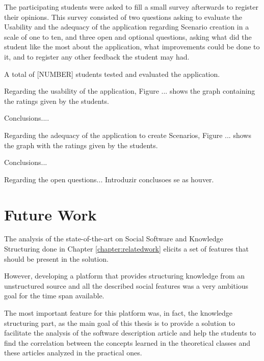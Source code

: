 \documentclass{llncs}
\begin{document}
The participating students were asked to fill a small survey afterwards to register their opinions.
This survey consisted of two questions asking to evaluate the Usability and the adequacy of the application regarding Scenario creation in a scale of one to ten, and three open and optional questions, asking what did the student like the most about the application, what improvements could be done to it, and to register any other feedback the student may had.

A total of [NUMBER] students tested and evaluated the application. 

Regarding the usability of the application, Figure ... shows the graph containing the ratings given by the students.

Conclusions....

Regarding the adequacy of the application to create Scenarios, Figure ... shows the graph with the ratings given by the students.

Conclusions...
\begin{figure}
\centering
{}
\end{figure}

Regarding the open questions... Introduzir conclusoes se as houver.
 

\section{Future Work}
\label{futureWork}

The analysis of the state-of-the-art on Social Software and Knowledge Structuring done in Chapter \ref{chapter:relatedwork} elicits a set of features that should be present in the solution.

However, developing a platform that provides structuring knowledge from an unstructured source and all the described social features was a very ambitious goal for the time span available. 

The most important feature for this platform was, in fact, the knowledge structuring part, as the main goal of this thesis is to provide a solution to facilitate the analysis of the software description article and help the students to find the correlation between the concepts learned in the theoretical classes and these articles analyzed in the practical ones.
\end{document}
